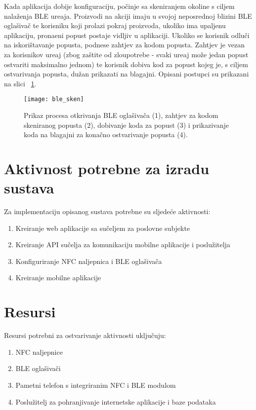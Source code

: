 Kada aplikacija dobije konfiguraciju, po\v{c}inje sa skeniranjem okoline s ciljem nala\v{z}enja BLE ure\dj aja. Proizvodi na akciji imaju u svojoj neposrednoj blizini BLE ogla\v{s}iva\v{c} te korisniku koji prolazi pokraj proizvoda, ukoliko ima upaljenu aplikaciju, prona\dj eni popust postaje vidljiv u aplikaciji. Ukoliko se korisnik odlu\v{c}i na iskori\v{s}tavanje popusta, podnese zahtjev za kodom popusta. Zahtjev je vezan za korisnikov ure\dj aj (zbog za\v{s}tite od zloupotrebe - svaki ure\dj aj mo\v{z}e jedan popust ostvariti maksimalno jednom) te korisnik dobiva kod za popust kojeg je, s ciljem ostvarivanja popusta, du\v{z}an prikazati na blagajni. Opisani postupci su prikazani na slici  ~\ref{fig:otkrivanjeBLEa}.

\begin{figure}[!htbp]
	\begin{center}
 \texttt{[image: ble\_sken]}
 \caption{Prikaz procesa otkrivanja BLE ogla\v{s}iva\v{c}a (1), zahtjev za kodom skeniranog popusta (2), dobivanje koda za popust (3) i prikazivanje koda na blagajni za kona\v{c}no ostvarivanje popusta (4).}
 \label{fig:otkrivanjeBLEa}
	\end{center}
\end{figure}

\section{Aktivnost potrebne za izradu sustava}

Za implementaciju opisanog sustava potrebne su sljede\'{c}e aktivnosti:
\begin{enumerate}
	\item Kreiranje web aplikacije sa su\v{c}eljem za poslovne subjekte
	\item Kreiranje API su\v{c}elja za komunikaciju mobilne aplikacije i poslu\v{z}itelja
	\item Konfiguriranje NFC naljepnica i BLE ogla\v{s}iva\v{c}a
	\item Kreiranje mobilne aplikacije
	
\end{enumerate}

\section{Resursi}

Resursi potrebni za ostvarivanje aktivnosti uklju\v{c}uju:
\begin{enumerate}
	\item NFC naljepnice
	\item BLE ogla\v{s}iva\v{c}i
	\item Pametni telefon s integriranim NFC i BLE modulom
	\item Poslu\v{z}itelj za pohranjivanje internetske aplikacije i baze podataka
\end{enumerate}


